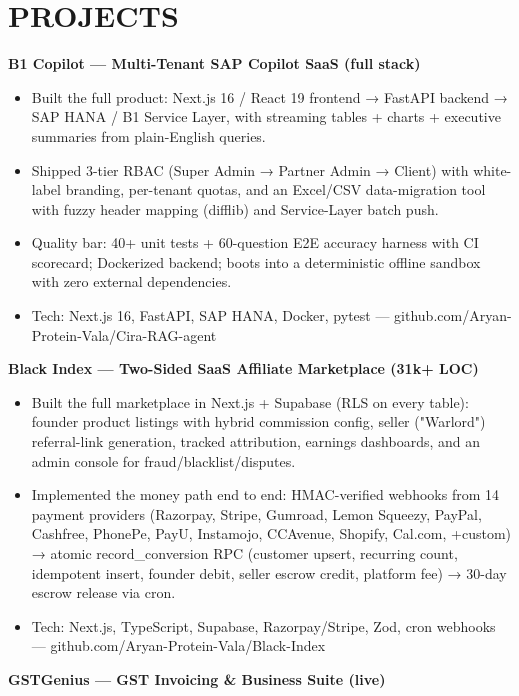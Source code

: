 \documentclass[9pt]{article}
\begin{document}
\section*{PROJECTS}
\textbf{B1 Copilot  ---  Multi-Tenant SAP Copilot SaaS (full stack)}
\vspace{1pt}
\begin{itemize}[leftmargin=11pt,itemsep=0pt,topsep=1pt,parsep=0pt]
\item Built the full product: Next.js 16 / React 19 frontend → FastAPI backend → SAP HANA / B1 Service Layer, with streaming tables + charts + executive summaries from plain-English queries.
\item Shipped 3-tier RBAC (Super Admin → Partner Admin → Client) with white-label branding, per-tenant quotas, and an Excel/CSV data-migration tool with fuzzy header mapping (difflib) and Service-Layer batch push.
\item Quality bar: 40+ unit tests + 60-question E2E accuracy harness with CI scorecard; Dockerized backend; boots into a deterministic offline sandbox with zero external dependencies.
\item Tech: Next.js 16, FastAPI, SAP HANA, Docker, pytest  ---  github.com/Aryan-Protein-Vala/Cira-RAG-agent
\end{itemize}
\textbf{Black Index  ---  Two-Sided SaaS Affiliate Marketplace (31k+ LOC)}
\vspace{1pt}
\begin{itemize}[leftmargin=11pt,itemsep=0pt,topsep=1pt,parsep=0pt]
\item Built the full marketplace in Next.js + Supabase (RLS on every table): founder product listings with hybrid commission config, seller ("Warlord") referral-link generation, tracked attribution, earnings dashboards, and an admin console for fraud/blacklist/disputes.
\item Implemented the money path end to end: HMAC-verified webhooks from 14 payment providers (Razorpay, Stripe, Gumroad, Lemon Squeezy, PayPal, Cashfree, PhonePe, PayU, Instamojo, CCAvenue, Shopify, Cal.com, +custom) → atomic record\_conversion RPC (customer upsert, recurring count, idempotent insert, founder debit, seller escrow credit, platform fee) → 30-day escrow release via cron.
\item Tech: Next.js, TypeScript, Supabase, Razorpay/Stripe, Zod, cron webhooks  ---  github.com/Aryan-Protein-Vala/Black-Index
\end{itemize}
\textbf{GSTGenius  ---  GST Invoicing \& Business Suite (live)}
\vspace{1pt}
\end{document}
